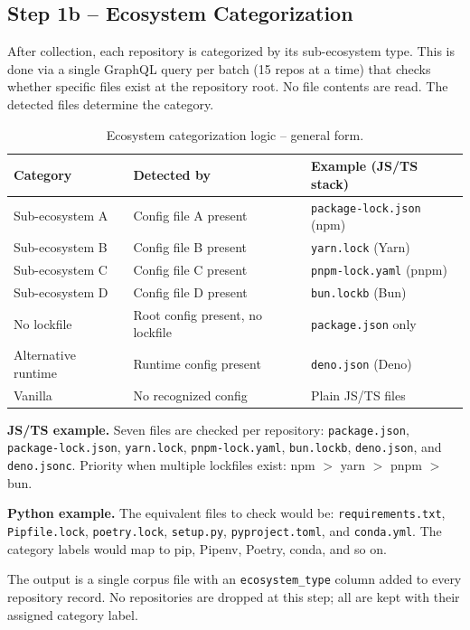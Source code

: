 \documentclass[11pt, a4paper]{article}
\begin{document}
\subsection*{Step 1b -- Ecosystem Categorization}

After collection, each repository is categorized by its sub-ecosystem type.
This is done via a single GraphQL query per batch (15 repos at a time) that
checks whether specific files exist at the repository root. No file contents
are read. The detected files determine the category.

\begin{table}[h]
\centering
\caption{Ecosystem categorization logic -- general form.}
\begin{tabular}{@{}lll@{}}
\toprule
\textbf{Category} & \textbf{Detected by} & \textbf{Example (JS/TS stack)} \\
\midrule
Sub-ecosystem A   & Config file A present             & \texttt{package-lock.json} (npm) \\
Sub-ecosystem B   & Config file B present             & \texttt{yarn.lock} (Yarn) \\
Sub-ecosystem C   & Config file C present             & \texttt{pnpm-lock.yaml} (pnpm) \\
Sub-ecosystem D   & Config file D present             & \texttt{bun.lockb} (Bun) \\
No lockfile       & Root config present, no lockfile  & \texttt{package.json} only \\
Alternative runtime & Runtime config present          & \texttt{deno.json} (Deno) \\
Vanilla           & No recognized config              & Plain JS/TS files \\
\bottomrule
\end{tabular}
\end{table}

\textbf{JS/TS example.} Seven files are checked per repository:
\texttt{package.json}, \texttt{package-lock.json}, \texttt{yarn.lock},
\texttt{pnpm-lock.yaml}, \texttt{bun.lockb}, \texttt{deno.json}, and
\texttt{deno.jsonc}. Priority when multiple lockfiles exist: npm $>$ yarn
$>$ pnpm $>$ bun.

\textbf{Python example.} The equivalent files to check would be:
\texttt{requirements.txt}, \texttt{Pipfile.lock}, \texttt{poetry.lock},
\texttt{setup.py}, \texttt{pyproject.toml}, and \texttt{conda.yml}. The
category labels would map to pip, Pipenv, Poetry, conda, and so on.

The output is a single corpus file with an \texttt{ecosystem\_type} column
added to every repository record. No repositories are dropped at this step;
all are kept with their assigned category label.
\end{document}
